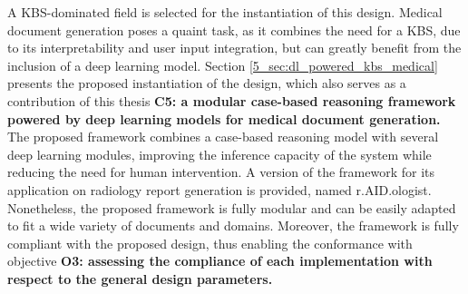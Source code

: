 A KBS-dominated field is selected for the instantiation of this design. Medical document generation poses a quaint task, as it combines the need for a KBS, due to its interpretability and user input integration, but can greatly benefit from the inclusion of a deep learning model. Section \ref{5_sec:dl_powered_kbs_medical} presents the proposed instantiation of the design, which also serves as a contribution of this thesis \textbf{C5: a modular case-based reasoning framework powered by deep learning models for medical document generation.} The proposed framework combines a case-based reasoning model with several deep learning modules, improving the inference capacity of the system while reducing the need for human intervention. A version of the framework for its application on radiology report generation is provided, named r.AID.ologist. Nonetheless, the proposed framework is fully modular and can be easily adapted to fit a wide variety of documents and domains. Moreover, the framework is fully compliant with the proposed design, thus enabling the conformance with objective \textbf{O3: assessing the compliance of each implementation with respect to the general design parameters.}